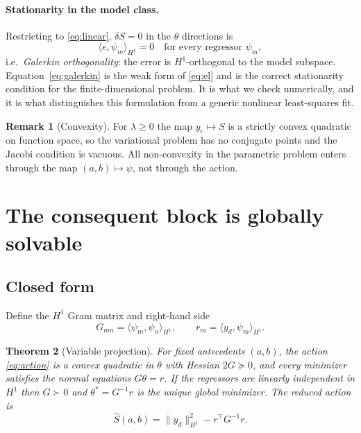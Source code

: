 \documentclass[11pt]{article}
\theoremstyle{plain}
\newtheorem{theorem}{Theorem}
\theoremstyle{definition}
\newtheorem{remark}[theorem]{Remark}
\newcommand{\Hone}{H^1}
\newcommand{\inner}[2]{\langle #1,#2\rangle_{\Hone}}
\begin{document}
\paragraph{Stationarity in the model class.} Restricting to \eqref{eq:linear},
$\delta S=0$ in the $\theta$ directions is
\begin{equation}
\inner{e}{\psi_m}=0\quad\text{for every regressor }\psi_m,
\label{eq:galerkin}
\end{equation}
i.e.\ \emph{Galerkin orthogonality}: the error is $H^1$-orthogonal to the model
subspace. Equation~\eqref{eq:galerkin} is the weak form of \eqref{eq:el} and is
the correct stationarity condition for the finite-dimensional problem. It is
what we check numerically, and it is what distinguishes this formulation from a
generic nonlinear least-squares fit.

\begin{remark}[Convexity]
For $\lambda\ge0$ the map $y_c\mapsto S$ is a strictly convex quadratic on
function space, so the variational problem has no conjugate points and the
Jacobi condition is vacuous. All non-convexity in the parametric problem enters
through the map $(a,b)\mapsto\psi$, not through the action.
\end{remark}

\section{The consequent block is globally solvable}
\label{sec:consequents}

\subsection{Closed form}

Define the $H^1$ Gram matrix and right-hand side
\begin{equation}
G_{mn}=\inner{\psi_m}{\psi_n},\qquad r_m=\inner{y_d}{\psi_m}.
\end{equation}

\begin{theorem}[Variable projection]
\label{thm:varpro}
For fixed antecedents $(a,b)$, the action \eqref{eq:action} is a convex
quadratic in $\theta$ with Hessian $2G\succeq0$, and every minimizer satisfies
the normal equations $G\theta=r$. If the regressors are linearly independent in
$H^1$ then $G\succ0$ and $\theta^{*}=G^{-1}r$ is the unique global minimizer.
The reduced action is
\begin{equation}
\widehat S(a,b)=\|y_d\|_{H^1}^{2}-r^{\top}G^{-1}r.
\label{eq:reduced}
\end{equation}
\end{theorem}
\end{document}
